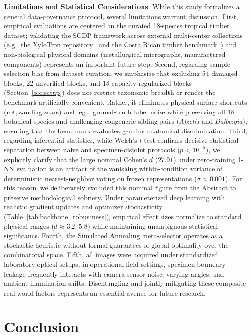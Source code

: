 \documentclass[a4paper,fleqn]{cas-sc}
\begin{document}
\textbf{Limitations and Statistical Considerations}: While this study formalizes a general data-governance protocol, several limitations warrant discussion. First, empirical evaluations are centered on the curated 18-species tropical timber dataset; validating the SCDP framework across external multi-center collections (e.g., the XyloTron repository~\cite{ravindran2020} and the Costa Rican timber benchmark~\cite{figueroamata2022}) and non-biological physical domains (metallurgical micrographs, manufactured components) represents an important future step. Second, regarding sample selection bias from dataset curation, we emphasize that excluding 54 damaged blocks, 22 unverified blocks, and 18 capacity-regularized blocks (Section~\ref{sec:setup}) does not restrict taxonomic breadth or render the benchmark artificially convenient. Rather, it eliminates physical surface shortcuts (rot, sanding scars) and legal ground-truth label noise while preserving all 18 botanical species and challenging congeneric sibling pairs (\textit{Afzelia} and \textit{Dalbergia}), ensuring that the benchmark evaluates genuine anatomical discrimination. Third, regarding inferential statistics, while Welch's $t$-test confirms decisive statistical separation between naive and specimen-disjoint protocols ($p < 10^{-5}$), we explicitly clarify that the large nominal Cohen's $d$ ($27.91$) under zero-training 1-NN evaluation is an artifact of the vanishing within-condition variance of deterministic nearest-neighbor voting on frozen representations ($\sigma \approx 0.001$). For this reason, we deliberately excluded this nominal figure from the Abstract to preserve methodological sobriety. Under parameterized deep learning with realistic gradient updates and optimizer stochasticity (Table~\ref{tab:backbone_robustness}), empirical effect sizes normalize to standard physical ranges ($d \approx 3.2$--$5.8$) while maintaining unambiguous statistical significance. Fourth, the Simulated Annealing meta-selector operates as a stochastic heuristic without formal guarantees of global optimality over the combinatorial space. Fifth, all images were acquired under standardized laboratory optical setups; in operational field settings, specimen boundary leakage frequently interacts with camera sensor noise, varying angles, and ambient illumination shifts. Disentangling and jointly mitigating these composite real-world factors represents an essential avenue for future research.

\section{Conclusion}
\label{sec:conclusion}
\end{document}
